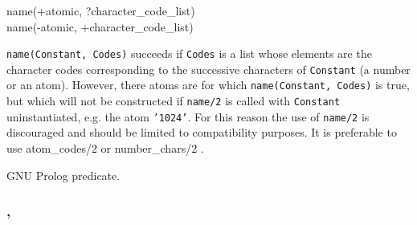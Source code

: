 \subsubsection{}

\begin{TemplatesOneCol}
name(+atomic, ?character\_code\_list)\\
name(-atomic, +character\_code\_list)

\end{TemplatesOneCol}

\Description

\texttt{name(Constant, Codes)} succeeds if \texttt{Codes} is a list whose
elements are the character codes corresponding to the successive characters
of \texttt{Constant} (a number or an atom). However, there atoms are for
which \texttt{name(Constant, Codes)} is true, but which will not be
constructed if \texttt{name/2} is called with \texttt{Constant}
uninstantiated, e.g. the atom \texttt{'1024'}. For this reason the use of
\texttt{name/2} is discouraged and should be limited to compatibility
purposes. It is preferable to use atom\_codes/2 
or number\_chars/2 .

\begin{PlErrors}






\end{PlErrors}

\Portability

GNU Prolog predicate.

\subsubsection{,
               }

